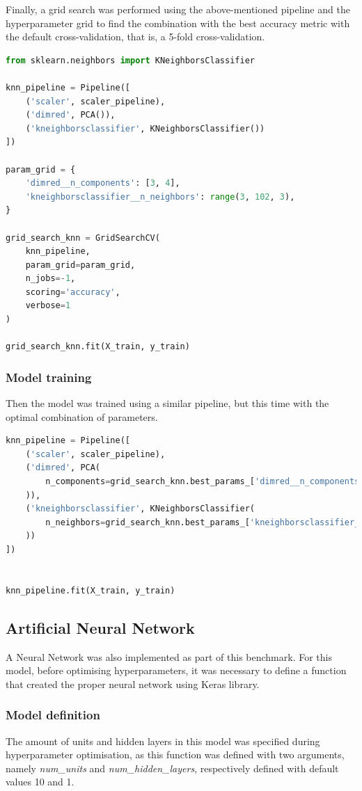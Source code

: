 \documentclass{article}
\begin{document}
Finally, a grid search was performed using the above-mentioned pipeline and the hyperparameter grid to find the combination with the best accuracy metric with the default cross-validation, that is, a 5-fold cross-validation.
\begin{lstlisting}[language=Python]
from sklearn.neighbors import KNeighborsClassifier

knn_pipeline = Pipeline([
    ('scaler', scaler_pipeline), 
    ('dimred', PCA()), 
    ('kneighborsclassifier', KNeighborsClassifier())
])

param_grid = {
    'dimred__n_components': [3, 4], 
    'kneighborsclassifier__n_neighbors': range(3, 102, 3),
}

grid_search_knn = GridSearchCV(
    knn_pipeline,
    param_grid=param_grid,
    n_jobs=-1,
    scoring='accuracy',
    verbose=1
)

grid_search_knn.fit(X_train, y_train)
\end{lstlisting}

\subsubsection{Model training}
Then the model was trained using a similar pipeline, but this time with the optimal combination of parameters.

\begin{lstlisting}[language=Python]
knn_pipeline = Pipeline([
    ('scaler', scaler_pipeline), 
    ('dimred', PCA(
        n_components=grid_search_knn.best_params_['dimred__n_components']
    )),
    ('kneighborsclassifier', KNeighborsClassifier(
        n_neighbors=grid_search_knn.best_params_['kneighborsclassifier__n_neighbors']
    ))
])


knn_pipeline.fit(X_train, y_train)
\end{lstlisting}

\subsection{Artificial Neural Network}

A Neural Network was also implemented as part of this benchmark. For this model, before optimising hyperparameters, it was necessary to define a function that created the proper neural network using Keras library. 

\subsubsection{Model definition}
The amount of units and hidden layers in this model was specified during hyperparameter optimisation, as this function was defined with two arguments, namely \emph{num\_units} and \emph{num\_hidden\_layers}, respectively defined with default values 10 and 1.
\end{document}
